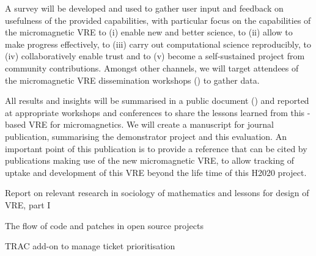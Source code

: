 \begin{workpackage}[id=social-aspects,wphases=0-48,
  title=Social Aspects,
  lead=UO,
  UORM=23,USHRM=18,USORM=6]
\begin{tasklist}
\begin{task}[title=Evaluation of Micromagnetic VRE,lead=USO,PM=6,
id=oommf-nb-evaluation,partners={UO,PS},wphases=28-40!0.5]
  A survey will be developed and used to gather user input and
  feedback on usefulness of the provided capabilities, with particular
  focus on the capabilities of the micromagnetic VRE to (i) enable new
  and better science, to (ii) allow to make progress effectively, to
  (iii) carry out computational science reproducibly, to (iv)
  collaboratively enable trust and to (v) become a self-sustained
  project from community contributions. Amongst other channels, we
  will target attendees of the micromagnetic VRE dissemination
  workshops () to
  gather data.

  All results and insights will be summarised in a public document
  () and reported at appropriate
  workshops and conferences to share the lessons learned from this
  \Jupyter-based VRE for micromagnetics. We will create a manuscript
  for journal publication, summarising the demonstrator project and
  this evaluation. An important point of this publication is to
  provide a reference that can be cited by publications making use of
  the new micromagnetic VRE, to allow tracking of uptake and
  development of this VRE beyond the life time of this H2020 project.
\end{task}



\end{tasklist}


\begin{wpdelivs}
\begin{wpdeliv}[due=3,id=social-report,dissem=PU,nature=R,lead=UO]
 {Report on relevant research in sociology of mathematics and lessons
   for design of \TheProject VRE, part I}
\end{wpdeliv}

\begin{wpdeliv}[due=18,id=social-datareport,dissem=PU,nature=R,lead=UO]
{The flow of code and patches in open source projects}
\end{wpdeliv}

\begin{wpdeliv}[due=24,id=social-tracaddon,dissem=PU,nature=OTHER,lead=UO]
{TRAC add-on to manage ticket prioritisation}
\end{wpdeliv}


\end{wpdelivs}
\end{workpackage}
